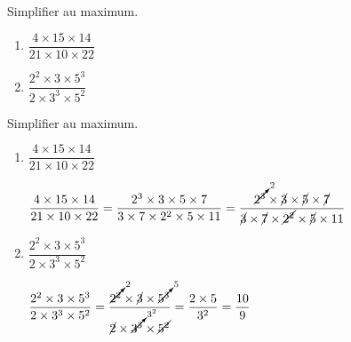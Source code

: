 \begin{exercice*}
    Simplifier au maximum.
    \begin{enumerate}
        \item $\dfrac{4\times 15\times 14}{21\times 10\times 22}$
        \item $\dfrac{2^2\times 3\times 5^3}{2\times 3^3\times 5^2}$
    \end{enumerate}    
\end{exercice*}
\begin{corrige}
    Simplifier au maximum.

    \begin{enumerate}
        \item $\dfrac{4\times 15\times 14}{21\times 10\times 22}$
        
        \textcolor{red}{
            $\dfrac{4\times 15\times 14}{21\times 10\times 22}=\dfrac{2^3\times 3\times 5\times 7}{3\times 7\times 2^2\times 5\times 11}=\dfrac{\cancelto{2}{2^3}\times \cancel{3}\times \cancel{5}\times \cancel{7}}{\cancel{3}\times \cancel{7}\times \cancel{2^2}\times \cancel{5}\times 11}$
        }
        \item $\dfrac{2^2\times 3\times 5^3}{2\times 3^3\times 5^2}$
        
        \textcolor{red}{
            $\dfrac{2^2\times 3\times 5^3}{2\times 3^3\times 5^2} = \dfrac{\cancelto{2}{2^2}\times \cancel{3}\times \cancelto{5}{5^3}}{\cancel{2}\times \cancelto{3^2}{3^3}\times \cancel{5^2}} = \dfrac{2\times 5}{3^2} = \dfrac{10}{9}$
        }
    \end{enumerate}    

\end{corrige}

